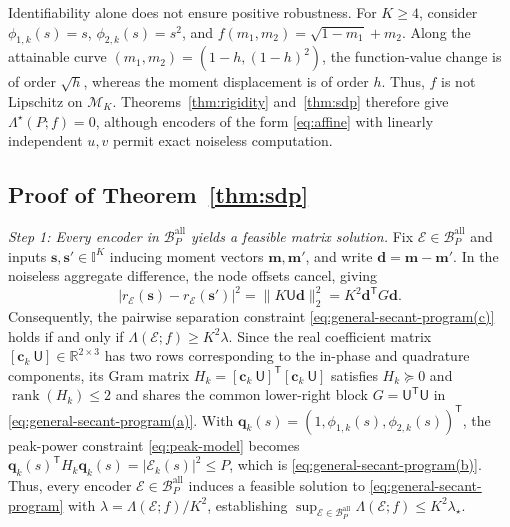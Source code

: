 \documentclass[journal,12pt,onecolumn,draftclsnofoot]{IEEEtran}
\newcommand{\enc}{\mathscr{E}}\newcommand{\dec}{\mathscr{D}}\newcommand{\R}{\mathbb R}\newcommand{\C}{\mathbb C}
\newcommand{\T}{\mathsf T}\newcommand{\suc}{\succeq}
\begin{document}
Identifiability alone does not ensure positive robustness.
For $K\ge4$, consider $\phi_{1,k}(s)=s$,
$\phi_{2,k}(s)=s^2$, and
$f(m_1,m_2)=\sqrt{1-m_1}+m_2$.
Along the attainable curve $(m_1,m_2)=(1-h,(1-h)^2)$,
the function-value change is of order $\sqrt h$, whereas
the moment displacement is of order $h$.
Thus, $f$ is not Lipschitz on $\mathcal M_K$.
Theorems~\ref{thm:rigidity} and~\ref{thm:sdp} therefore give
$\Lambda^\star(P;f)=0$, although encoders of the form
\eqref{eq:affine} with linearly independent $u,v$ permit
exact noiseless computation.






\subsection{Proof of Theorem~\ref{thm:sdp}}\label{app:general-robust}


\emph{Step 1: Every encoder in $\mathcal B_P^{\mathrm{all}}$ yields a feasible matrix solution.}
Fix $\enc\in\mathcal B_P^{\mathrm{all}}$ and inputs
$\boldsymbol s,\boldsymbol s'\in\mathbb I^K$ inducing moment vectors
$\boldsymbol m,\boldsymbol m'$, and write
$\boldsymbol d=\boldsymbol m-\boldsymbol m'$. 
In the noiseless aggregate difference, the node offsets cancel, giving
$$
|r_\enc(\boldsymbol s)-r_\enc(\boldsymbol s')|^2
=\|K\mathsf U\boldsymbol d\|_2^2
=K^2\boldsymbol d^\T G\boldsymbol d.
$$
Consequently, the pairwise separation constraint \eqref{eq:general-secant-program(c)} holds if and only if $\Lambda(\enc;f)\ge K^2\lambda$.
Since the real coefficient matrix $[\boldsymbol c_k\ \mathsf U]\in\R^{2\times 3}$ has two rows corresponding to the in-phase and quadrature components, its Gram matrix
$H_k=[\boldsymbol c_k\ \mathsf U]^\T[\boldsymbol c_k\ \mathsf U]$
satisfies $H_k\succeq0$ and $\operatorname{rank}(H_k)\le2$ and shares the common lower-right block $G=\mathsf U^\T\mathsf U$ in \eqref{eq:general-secant-program(a)}.
With $\boldsymbol q_k(s)=(1,\phi_{1,k}(s),\phi_{2,k}(s))^\T$, the peak-power constraint \eqref{eq:peak-model} becomes
$\boldsymbol q_k(s)^\T H_k\boldsymbol q_k(s)=|\enc_k(s)|^2\le P$,
which is \eqref{eq:general-secant-program(b)}.
Thus, every encoder $\enc\in\mathcal B_P^{\mathrm{all}}$ induces a feasible solution to \eqref{eq:general-secant-program} with $\lambda=\Lambda(\enc;f)/K^2$, establishing $\sup_{\enc\in\mathcal B_P^{\mathrm{all}}}\Lambda(\enc;f)\le K^2\lambda_\star$.
\end{document}
